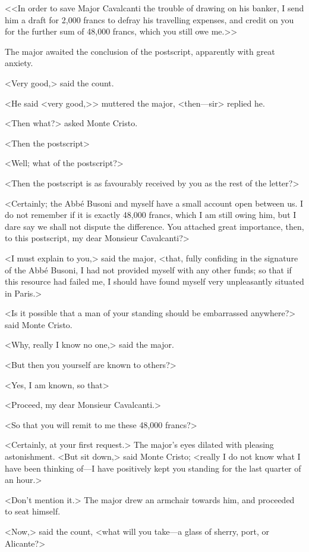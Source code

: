 <<In order to save Major Cavalcanti the trouble of drawing on his banker, I send him a draft for 2,000 francs to defray his travelling expenses, and credit on you for the further sum of 48,000 francs, which you still owe me.>> 

 The major awaited the conclusion of the postscript, apparently with great anxiety. 

 <Very good,> said the count. 

 <He said <very good,>> muttered the major, <then—sir\longdash> replied he. 

 <Then what?> asked Monte Cristo. 

 <Then the postscript\longdash> 

 <Well; what of the postscript?> 

 <Then the postscript is as favourably received by you as the rest of the letter?> 

 <Certainly; the Abbé Busoni and myself have a small account open between us. I do not remember if it is exactly 48,000 francs, which I am still owing him, but I dare say we shall not dispute the difference. You attached great importance, then, to this postscript, my dear Monsieur Cavalcanti?> 

 <I must explain to you,> said the major, <that, fully confiding in the signature of the Abbé Busoni, I had not provided myself with any other funds; so that if this resource had failed me, I should have found myself very unpleasantly situated in Paris.> 

 <Is it possible that a man of your standing should be embarrassed anywhere?> said Monte Cristo. 

 <Why, really I know no one,> said the major. 

 <But then you yourself are known to others?> 

 <Yes, I am known, so that\longdash> 

 <Proceed, my dear Monsieur Cavalcanti.> 

 <So that you will remit to me these 48,000 francs?> 

 <Certainly, at your first request.> The major's eyes dilated with pleasing astonishment. <But sit down,> said Monte Cristo; <really I do not know what I have been thinking of—I have positively kept you standing for the last quarter of an hour.> 

 <Don't mention it.> The major drew an armchair towards him, and proceeded to seat himself. 

 <Now,> said the count, <what will you take—a glass of sherry, port, or Alicante?> 

